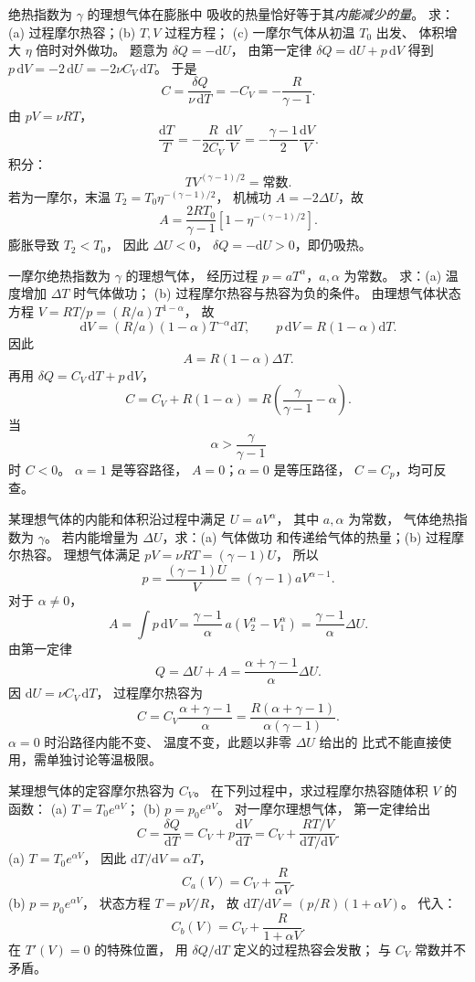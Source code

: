 绝热指数为 $\gamma$ 的理想气体在膨胀中
吸收的热量恰好等于其\emph{内能减少的量}。
求：(a) 过程摩尔热容；(b) $T,V$ 过程方程；
(c) 一摩尔气体从初温 $T_0$ 出发、
体积增大 $\eta$ 倍时对外做功。
\exsolution
题意为 $\delta Q=-\mathrm dU$，
由第一定律
$\delta Q=\mathrm dU+p\,\mathrm dV$
得到
$p\,\mathrm dV=-2\,\mathrm dU=-2\nu C_V\,\mathrm dT$。
于是
\[
\boxed{C=\frac{\delta Q}{\nu\,\mathrm dT}=-C_V
=-\frac R{\gamma-1}}.
\]
由 $pV=\nu RT$，
\[
\frac{\mathrm dT}{T}
=-\frac{R}{2C_V}\frac{\mathrm dV}{V}
=-\frac{\gamma-1}{2}\frac{\mathrm dV}{V}.
\]
积分：
\[
\boxed{TV^{(\gamma-1)/2}=\text{常数}}.
\]
若为一摩尔，末温
$T_2=T_0\eta^{-(\gamma-1)/2}$，
机械功 $A=-2\Delta U$，故
\[
\boxed{A=\frac{2RT_0}{\gamma-1}
\left[1-\eta^{-(\gamma-1)/2}\right]}.
\]
\excheck 膨胀导致 $T_2<T_0$，
因此 $\Delta U<0$，
$\delta Q=-\mathrm dU>0$，即仍吸热。

一摩尔绝热指数为 $\gamma$ 的理想气体，
经历过程 $p=aT^\alpha$，$a,\alpha$ 为常数。
求：(a) 温度增加 $\Delta T$ 时气体做功；
(b) 过程摩尔热容与热容为负的条件。
\exsolution
由理想气体状态方程
$V=RT/p=(R/a)T^{1-\alpha}$，
故
\[
\mathrm dV=(R/a)(1-\alpha)T^{-\alpha}\mathrm dT,
\qquad p\,\mathrm dV=R(1-\alpha)\mathrm dT.
\]
因此
\[
\boxed{A=R(1-\alpha)\Delta T}.
\]
再用
$\delta Q=C_V\,\mathrm dT+p\,\mathrm dV$，
\[
\boxed{C=C_V+R(1-\alpha)
=R\left(\frac{\gamma}{\gamma-1}-\alpha\right)}.
\]
当
\[
\boxed{\alpha>\frac{\gamma}{\gamma-1}}
\]
时 $C<0$。
\excheck $\alpha=1$ 是等容路径，
$A=0$；$\alpha=0$ 是等压路径，
$C=C_p$，均可反查。

某理想气体的内能和体积沿过程中满足
$U=aV^\alpha$，
其中 $a,\alpha$ 为常数，
气体绝热指数为 $\gamma$。
若内能增量为 $\Delta U$，求：(a) 气体做功
和传递给气体的热量；(b) 过程摩尔热容。
\exsolution
理想气体满足
$pV=\nu RT=(\gamma-1)U$，
所以
\[
p=\frac{(\gamma-1)U}{V}
=(\gamma-1)aV^{\alpha-1}.
\]
对于 $\alpha\ne0$，
\[
A=\int p\,\mathrm dV
=\frac{\gamma-1}{\alpha}
\,a(V_2^\alpha-V_1^\alpha)
=\boxed{\frac{\gamma-1}{\alpha}\Delta U}.
\]
由第一定律
\[
\boxed{Q=\Delta U+A
=\frac{\alpha+\gamma-1}{\alpha}\Delta U}.
\]
因 $\mathrm dU=\nu C_V\,\mathrm dT$，
过程摩尔热容为
\[
\boxed{C=C_V\frac{\alpha+\gamma-1}{\alpha}
=\frac{R(\alpha+\gamma-1)}
{\alpha(\gamma-1)}}.
\]
\excheck $\alpha=0$ 时沿路径内能不变、
温度不变，此题以非零 $\Delta U$ 给出的
比式不能直接使用，需单独讨论等温极限。

某理想气体的定容摩尔热容为 $C_V$。
在下列过程中，求过程摩尔热容随体积 $V$ 的函数：
(a) $T=T_0e^{\alpha V}$；
(b) $p=p_0e^{\alpha V}$。
\exsolution
对一摩尔理想气体，
第一定律给出
\[
C=\frac{\delta Q}{\mathrm dT}
=C_V+p\frac{\mathrm dV}{\mathrm dT}
=C_V+\frac{RT/V}{\mathrm dT/\mathrm dV}.
\]
(a) $T=T_0e^{\alpha V}$，
因此 $\mathrm dT/\mathrm dV=\alpha T$，
\[
\boxed{C_a(V)=C_V+\frac R{\alpha V}}.
\]
(b) $p=p_0e^{\alpha V}$，
状态方程 $T=pV/R$，
故
$\mathrm dT/\mathrm dV=(p/R)(1+\alpha V)$。
代入：
\[
\boxed{C_b(V)=C_V+\frac R{1+\alpha V}}.
\]
\excheck 在 $T'(V)=0$ 的特殊位置，
用 $\delta Q/\mathrm dT$ 定义的过程热容会发散；
与 $C_V$ 常数并不矛盾。

